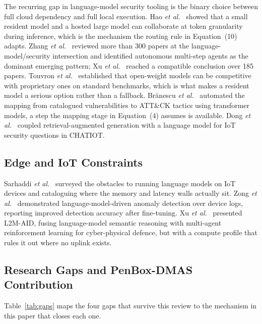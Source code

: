 \documentclass[journal]{IEEEtran}
\begin{document}
The recurring gap in language-model security tooling is the binary choice
between full cloud dependency and full local execution. Hao
\emph{et al.}~\cite{hao2024} showed that a small resident model and a hosted
large model can collaborate at token granularity during inference, which is
the mechanism the routing rule in Equation~(10) adapts. Zhang
\emph{et al.}~\cite{zhang2025} reviewed more than 300 papers at the
language-model/security intersection and identified autonomous multi-step
agents as the dominant emerging pattern; Xu \emph{et al.}~\cite{xu2024survey}
reached a compatible conclusion over 185 papers. Touvron
\emph{et al.}~\cite{touvron2023llama} established that open-weight models can
be competitive with proprietary ones on standard benchmarks, which is what
makes a resident model a serious option rather than a fallback. Br\u{a}nescu
\emph{et al.}~\cite{branescu2024} automated the mapping from catalogued
vulnerabilities to ATT\&CK tactics using transformer models, a step the
mapping stage in Equation~(4) assumes is available. Dong
\emph{et al.}~\cite{dong2025} coupled retrieval-augmented generation with a
language model for IoT security questions in CHATIOT.

\subsection{Edge and IoT Constraints}

Sarhaddi \emph{et al.}~\cite{sarhaddi2026} surveyed the obstacles to running
language models on IoT devices and cataloguing where the memory and latency
walls actually sit. Zong \emph{et al.}~\cite{zong2025} demonstrated
language-model-driven anomaly detection over device logs, reporting improved
detection accuracy after fine-tuning. Xu \emph{et al.}~\cite{xu2025} presented
L2M-AID, fusing language-model semantic reasoning with multi-agent
reinforcement learning for cyber-physical defence, but with a compute profile
that rules it out where no uplink exists.

\subsection{Research Gaps and PenBox-DMAS Contribution}

Table~\ref{tab:gaps} maps the four gaps that survive this review to the
mechanism in this paper that closes each one.
\end{document}
